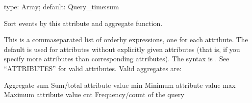 \documentclass[letterpaper,10pt,english]{sphinxmanual}
\begin{document}

\begin{fulllineitems}
\label{\detokenize{mariadb-query-digest:cmdoption-mariadb-query-digest-order-by}}
\sphinxAtStartPar
type: Array; default: Query\_time:sum

\sphinxAtStartPar
Sort events by this attribute and aggregate function.

\sphinxAtStartPar
This is a comma\sphinxhyphen{}separated list of order\sphinxhyphen{}by expressions, one for each
{\hyperref[\detokenize{mariadb-query-digest:cmdoption-mariadb-query-digest-group-by}]{}} attribute.  The default  is used for
{\hyperref[\detokenize{mariadb-query-digest:cmdoption-mariadb-query-digest-group-by}]{}} attributes without explicitly given {\hyperref[\detokenize{mariadb-query-digest:cmdoption-mariadb-query-digest-order-by}]{}} attributes
(that is, if you specify more {\hyperref[\detokenize{mariadb-query-digest:cmdoption-mariadb-query-digest-group-by}]{}} attributes than corresponding
{\hyperref[\detokenize{mariadb-query-digest:cmdoption-mariadb-query-digest-order-by}]{}} attributes).  The syntax is .  See
“ATTRIBUTES” for valid attributes.  Valid aggregates are:

\begin{sphinxVerbatim}[commandchars=\\\{\}]
Aggregate 
 
sum       Sum/total attribute value
min       Minimum attribute value
max       Maximum attribute value
cnt       Frequency/count of the query
\end{sphinxVerbatim}


\end{fulllineitems}
\end{document}

